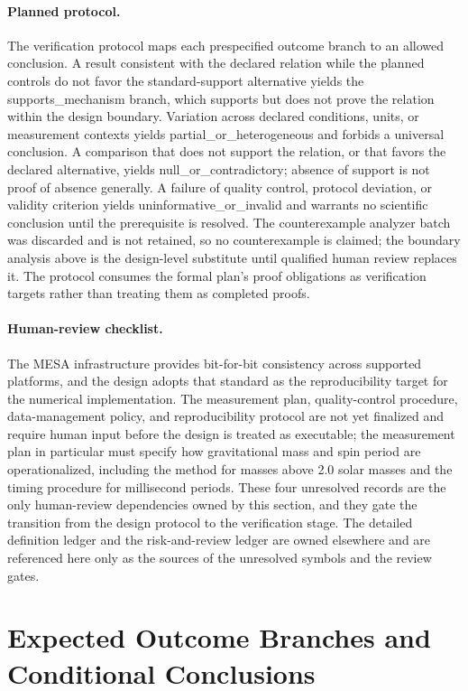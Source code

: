 \documentclass[conference]{IEEEtran}
\begin{document}
\paragraph{Planned protocol.} The verification protocol maps each prespecified outcome branch to an allowed conclusion. A result consistent with the declared relation while the planned controls do not favor the standard-support alternative yields the supports\_mechanism branch, which supports but does not prove the relation within the design boundary. Variation across declared conditions, units, or measurement contexts yields partial\_or\_heterogeneous and forbids a universal conclusion. A comparison that does not support the relation, or that favors the declared alternative, yields null\_or\_contradictory; absence of support is not proof of absence generally. A failure of quality control, protocol deviation, or validity criterion yields uninformative\_or\_invalid and warrants no scientific conclusion until the prerequisite is resolved. The counterexample analyzer batch was discarded and is not retained, so no counterexample is claimed; the boundary analysis above is the design-level substitute until qualified human review replaces it. The protocol consumes the formal plan's proof obligations as verification targets rather than treating them as completed proofs.

\paragraph{Human-review checklist.} The MESA infrastructure provides bit-for-bit consistency across supported platforms, and the design adopts that standard as the reproducibility target for the numerical implementation. The measurement plan, quality-control procedure, data-management policy, and reproducibility protocol are not yet finalized and require human input before the design is treated as executable; the measurement plan in particular must specify how gravitational mass and spin period are operationalized, including the method for masses above 2.0 solar masses and the timing procedure for millisecond periods. These four unresolved records are the only human-review dependencies owned by this section, and they gate the transition from the design protocol to the verification stage. The detailed definition ledger and the risk-and-review ledger are owned elsewhere and are referenced here only as the sources of the unresolved symbols and the review gates.~\cite{cite_c369df652181e8f7}

\section{Expected Outcome Branches and Conditional Conclusions}
\end{document}
